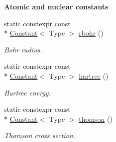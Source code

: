 \begin{Indent}{\bf Atomic and nuclear constants}
\begin{DoxyCompactItemize}
static constexpr const \\*
\hyperlink{exceptionmagrathea_1_1Constant}{Constant}$<$ Type $>$ \hyperlink{exceptionmagrathea_1_1Constants_aba14db3aa75fed81f2ec63703f8d49ca}{rbohr} ()
\begin{DoxyCompactList}\small\item\em Bohr radius. \end{DoxyCompactList}\item 
static constexpr const \\*
\hyperlink{exceptionmagrathea_1_1Constant}{Constant}$<$ Type $>$ \hyperlink{exceptionmagrathea_1_1Constants_aa90e521df0f03462cb1c5da4fcf74058}{hartree} ()
\begin{DoxyCompactList}\small\item\em Hartree energy. \end{DoxyCompactList}\item 
static constexpr const \\*
\hyperlink{exceptionmagrathea_1_1Constant}{Constant}$<$ Type $>$ \hyperlink{exceptionmagrathea_1_1Constants_a6dc584d8068d5afab6b3599a99b51fd2}{thomson} ()
\begin{DoxyCompactList}\small\item\em Thomson cross section. \end{DoxyCompactList}\end{DoxyCompactItemize}
\end{Indent}

